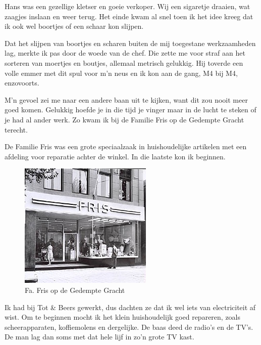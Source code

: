\documentclass[10pt,twoside, openright]{memoir}
\begin{document}
Hans was een gezellige kletser en goeie verkoper. Wij een sigaretje draaien, wat zaagjes inslaan en weer terug. Het einde kwam al snel toen ik het idee kreeg dat ik ook wel boortjes of een schaar kon slijpen. 

Dat het slijpen van boortjes en scharen buiten de mij toegestane werkzaamheden lag, merkte ik pas door de woede van de chef. Die zette me voor straf aan het sorteren van moertjes en boutjes, allemaal metrisch gelukkig. Hij toverde een volle emmer met dit spul voor m’n neus en ik kon aan de gang, M4 bij M4, enzovoorts. 

M’n gevoel zei me naar een andere baan uit te kijken, want dit zou nooit meer goed komen. Gelukkig hoefde je in die tijd je vinger maar in de lucht te steken of je had al ander werk. Zo kwam ik bij de Familie Fris op de Gedempte Gracht terecht.

De Familie Fris was een grote speciaalzaak in huishoudelijke artikelen met een afdeling voor reparatie achter de winkel. In die laatste kon ik beginnen. 

\begin{figure}
\includegraphics[width=\textwidth]{img/ch32/Fris}
\caption*{\footnotesize Fa. Fris op de Gedempte Gracht}
\end{figure}

Ik had bij Tot \& Beers gewerkt, dus dachten ze dat ik wel iets van electriciteit af wist. Om te beginnen mocht ik het klein huishoudelijk goed repareren, zoals scheerapparaten, koffiemolens en dergelijke. De baas deed de radio’s en de TV’s. De man lag dan soms met dat hele lijf in zo’n grote TV kast. 
\end{document}
